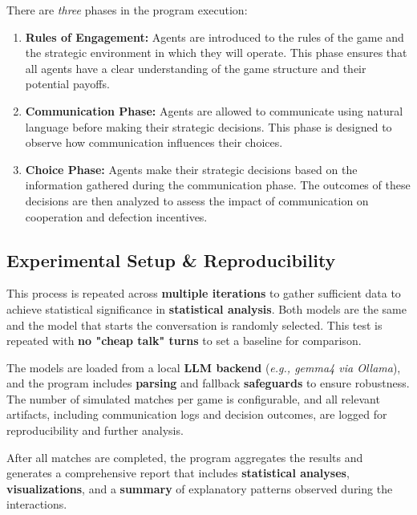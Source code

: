 There are \textit{three} phases in the program execution:
\begin{enumerate}[itemsep=0.2em]
    \item \textbf{Rules of Engagement:} Agents are introduced to the rules of the game and the strategic environment in which they will operate. This phase ensures that all agents have a clear understanding of the game structure and their potential payoffs.
    \item \textbf{Communication Phase:} Agents are allowed to communicate using natural language before making their strategic decisions. This phase is designed to observe how communication influences their choices.
    \item \textbf{Choice Phase:} Agents make their strategic decisions based on the information gathered during the communication phase. The outcomes of these decisions are then analyzed to assess the impact of communication on cooperation and defection incentives.
\end{enumerate}

\subsection{Experimental Setup \& Reproducibility}
This process is repeated across \textbf{multiple iterations} to gather sufficient data to achieve statistical significance in \textbf{statistical analysis}.
Both models are the same and the model that starts the conversation is randomly selected.
This test is repeated with \textbf{no "cheap talk" turns} to set a baseline for comparison.

The models are loaded from a local \textbf{LLM backend} (\textit{e.g., gemma4 via Ollama}), and the program includes \textbf{parsing} and fallback \textbf{safeguards} to ensure robustness.
The number of simulated matches per game is configurable, and all relevant artifacts, including communication logs and decision outcomes, are logged for reproducibility and further analysis.

After all matches are completed, the program aggregates the results and generates a comprehensive report that includes \textbf{statistical analyses}, \textbf{visualizations}, and a \textbf{summary} of explanatory patterns observed during the interactions.